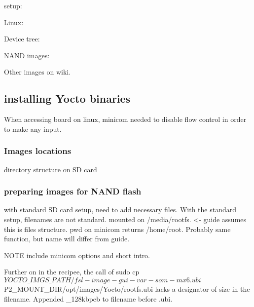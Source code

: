 \documentclass[10pt]{article}
\begin{document}
setup:

Linux:

Device tree:

NAND images:


Other images on wiki.

\subsection{ installing Yocto binaries}
    When accessing board on linux, minicom needed to disable flow control in order to make any input.

    \subsubsection{ Images locations}
    directory structure on SD card
    

        \subsubsection{preparing images for NAND flash }
        with standard SD card setup, need to add necessary files. With the standard setup, filenames are not standard.
        mounted on /media/rootfs. <- guide assumes this is files structure. pwd on minicom returns /home/root. Probably same function, but name will differ from
        guide.

        NOTE include minicom options and short intro.

        Further on in the recipee, the call of sudo cp ${YOCTO\_IMGS\_PATH}/fsl-image-gui-var-som-mx6.ubi ${P2\_MOUNT\_DIR}/opt/images/Yocto/rootfs.ubi
        lacks a designator of size in the filename. Appended \_128kbpeb to filename before .ubi.
\end{document}
